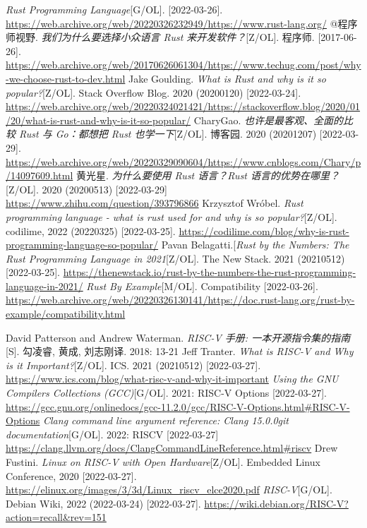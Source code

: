 \documentclass[UTF8,fontset=none,linespread=1.15]{ctexart}
\begin{document}
\begin{thebibliography}{99}
 \textit{Rust Programming Language}[G/OL]. [2022-03-26]. \url{https://web.archive.org/web/20220326232949/https://www.rust-lang.org/}
 @程序师视野. \textit{我们为什么要选择小众语言 Rust 来开发软件？}[Z/OL]. 程序师. [2017-06-26]. \url{https://web.archive.org/web/20170626061304/https://www.techug.com/post/why-we-choose-rust-to-dev.html}
Jake Goulding. \textit{What is Rust and why is it so popular?}[Z/OL]. Stack Overflow Blog. 2020 (20200120) [2022-03-24]. \url{https://web.archive.org/web/20220324021421/https://stackoverflow.blog/2020/01/20/what-is-rust-and-why-is-it-so-popular/}
 CharyGao. \textit{也许是最客观、全面的比较 Rust 与 Go：都想把 Rust 也学一下}[Z/OL]. 博客园. 2020 (20201207) [2022-03-29]. \url{https://web.archive.org/web/20220329090604/https://www.cnblogs.com/Chary/p/14097609.html}
 黄光星. \textit{为什么要使用 Rust 语言？Rust 语言的优势在哪里？}[Z/OL].
2020 (20200513) [2022-03-29] \url{https://www.zhihu.com/question/393796866}
 Krzysztof Wróbel. \textit{Rust programming language - what is rust used for and why is so popular?}[Z/OL]. codilime, 2022 (20220325) [2022-03-25]. \url{https://codilime.com/blog/why-is-rust-programming-language-so-popular/}
 Pavan Belagatti.[\textit{Rust by the Numbers: The Rust Programming Language in 2021}[Z/OL]. The New Stack. 2021 (20210512) [2022-03-25]. \url{https://thenewstack.io/rust-by-the-numbers-the-rust-programming-language-in-2021/}
 \textit{Rust By Example}[M/OL]. Compatibility [2022-03-26]. \url{https://web.archive.org/web/20220326130141/https://doc.rust-lang.org/rust-by-example/compatibility.html}

 David Patterson and Andrew Waterman. \textit{RISC-V 手册: 一本开源指令集的指南}[S]. 勾凌睿, 黄成, 刘志刚译. 2018: 13-21
 Jeff Tranter. \textit{What is RISC-V and Why is it Important?}[Z/OL]. ICS. 2021 (20210512) [2022-03-27]. \url{https://www.ics.com/blog/what-risc-v-and-why-it-important}
 \textit{Using the GNU Compilers Collections (GCC)}[G/OL]. 2021: RISC-V Options [2022-03-27]. \url{https://gcc.gnu.org/onlinedocs/gcc-11.2.0/gcc/RISC-V-Options.html#RISC-V-Options}
 \textit{Clang command line argument reference: Clang 15.0.0git documentation}[G/OL]. 2022: RISCV [2022-03-27] \url{https://clang.llvm.org/docs/ClangCommandLineReference.html#riscv}
 Drew Fustini. \textit{Linux on RISC-V
with Open Hardware}[Z/OL]. Embedded Linux Conference, 2020 [2022-03-27]. \url{https://elinux.org/images/3/3d/Linux_riscv_elce2020.pdf}
 \textit{RISC-V}[G/OL]. Debian Wiki, 2022 (2022-03-24) [2022-03-27]. \url{https://wiki.debian.org/RISC-V?action=recall&rev=151}


\end{thebibliography}
\end{document}
